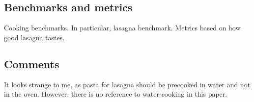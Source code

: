 \subsection*{Benchmarks and metrics}
Cooking benchmarks. In particular, lasagna benchmark.
Metrics based on how good lasagna tastes.

\subsection*{Comments}
It looks strange to me, as pasta for lasagna should be precooked in water and not in the oven. However, there is no reference to water-cooking in this paper.

